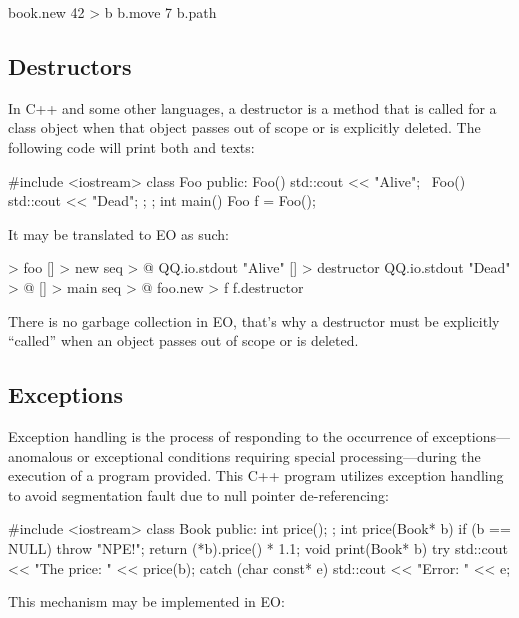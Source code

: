 \documentclass[sigplan,11pt,nonacm,natbib=false]{acmart}
\begin{document}
\begin{ffcode}
book.new 42 > b
b.move 7
b.path
\end{ffcode}

\subsection{Destructors}
\label{sec:destructors}

In C++ and some other languages, a destructor is a method that is called for a class object when that object passes out of scope or is explicitly deleted. The following code will print both  and  texts:

\begin{ffcode}
#include <iostream>
class Foo {
public:
  Foo() { std::cout << "Alive"; }
  ~Foo() { std::cout << "Dead"; };
};
int main() {
  Foo f = Foo();
}
\end{ffcode}

It may be translated to EO as such:

\begin{ffcode}
[] > foo
  [] > new
    seq > @
      QQ.io.stdout "Alive"
      [] > destructor
        QQ.io.stdout "Dead" > @
[] > main
  seq > @
    foo.new > f
    f.destructor
\end{ffcode}

There is no garbage collection in EO, that's why a destructor must be explicitly ``called'' when an object passes out of scope or is deleted.

\subsection{Exceptions}
\label{sec:exceptions}

Exception handling is the process of responding to the occurrence of exceptions---anomalous or exceptional conditions requiring special processing---during the execution of a program provided. This C++ program utilizes exception handling to avoid segmentation fault due to null pointer de-referencing:

\begin{ffcode}
#include <iostream>
class Book { public: int price(); };
int price(Book* b) {
  if (b == NULL) throw "NPE!";
  return (*b).price() * 1.1;
}
void print(Book* b) {
  try {
    std::cout << "The price: " << price(b);
  } catch (char const* e) {
    std::cout << "Error: " << e;
  }
}
\end{ffcode}

This mechanism may be implemented in EO:
\end{document}

